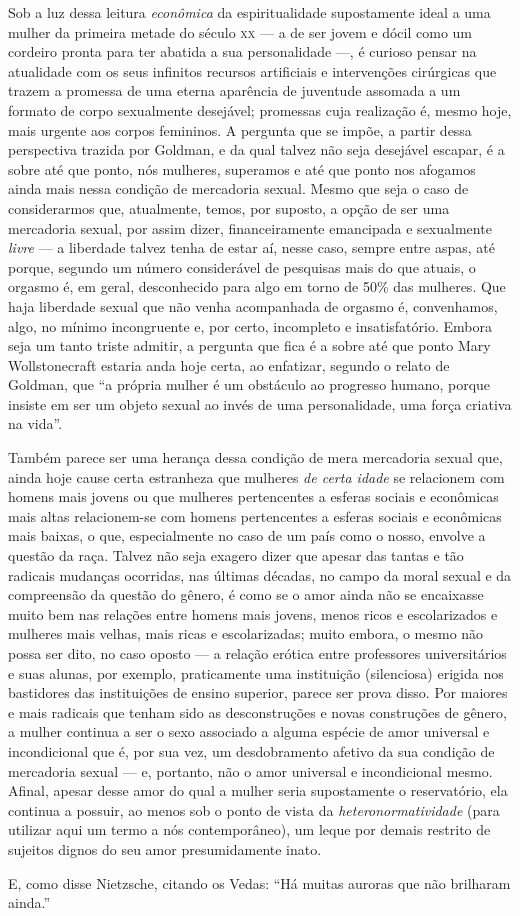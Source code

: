 Sob a luz dessa leitura \textit{econômica} da espiritualidade
supostamente ideal a uma mulher da primeira metade do século \textsc{xx} --- a de
ser jovem e dócil como um cordeiro pronta para ter abatida a sua
personalidade ---, é curioso pensar na atualidade com os seus infinitos
recursos artificiais e intervenções cirúrgicas que trazem a promessa de
uma eterna aparência de juventude assomada a um formato de corpo
sexualmente desejável; promessas cuja realização é, mesmo hoje, mais
urgente aos corpos femininos. A pergunta que se impõe, a partir dessa
perspectiva trazida por Goldman, e da qual talvez não seja desejável
escapar, é a sobre até que ponto, nós mulheres, superamos e até que
ponto nos afogamos ainda mais nessa condição de mercadoria sexual. Mesmo
que seja o caso de considerarmos que, atualmente, temos, por suposto, a
opção de ser uma mercadoria sexual, por assim dizer, financeiramente
emancipada e sexualmente \textit{livre} --- a liberdade talvez tenha de estar
aí, nesse caso, sempre entre aspas, até porque, segundo um número
considerável de pesquisas mais do que atuais, o orgasmo é, em geral,
desconhecido para algo em torno de 50\% das mulheres. Que haja liberdade
sexual que não venha acompanhada de orgasmo é, convenhamos, algo, no
mínimo incongruente e, por certo, incompleto e insatisfatório. Embora
seja um tanto triste admitir, a pergunta que fica é a sobre até que
ponto Mary Wollstonecraft estaria anda hoje certa, ao enfatizar, segundo
o relato de Goldman, que ``a própria mulher é um obstáculo ao progresso
humano, porque insiste em ser um objeto sexual ao invés de uma
personalidade, uma força criativa na vida''.

Também parece ser uma herança dessa condição de mera mercadoria sexual
que, ainda hoje cause certa estranheza que mulheres \textit{de certa idade}
se relacionem com homens mais jovens ou que mulheres pertencentes a
esferas sociais e econômicas mais altas relacionem-se com homens
pertencentes a esferas sociais e econômicas mais baixas, o que,
especialmente no caso de um país como o nosso, envolve a questão da
raça. Talvez não seja exagero dizer que apesar das tantas e tão radicais
mudanças ocorridas, nas últimas décadas, no campo da moral sexual e da
compreensão da questão do gênero, é como se o amor ainda não se
encaixasse muito bem nas relações entre homens mais jovens, menos ricos
e escolarizados e mulheres mais velhas, mais ricas e escolarizadas;
muito embora, o mesmo não possa ser dito, no caso oposto --- a relação
erótica entre professores universitários e suas alunas, por exemplo,
praticamente uma instituição (silenciosa) erigida nos bastidores das
instituições de ensino superior, parece ser prova disso. Por maiores e
mais radicais que tenham sido as desconstruções e novas construções de
gênero, a mulher continua a ser o sexo associado a alguma espécie de
amor universal e incondicional que é, por sua vez, um desdobramento
afetivo da sua condição de mercadoria sexual --- e, portanto, não o amor
universal e incondicional mesmo. Afinal, apesar desse amor do qual a
mulher seria supostamente o reservatório, ela continua a possuir, ao
menos sob o ponto de vista da \textit{heteronormatividade} (para utilizar aqui um
termo a nós contemporâneo), um leque por demais restrito de sujeitos
dignos do seu amor presumidamente inato.

E, como disse Nietzsche, citando os Vedas: ``Há muitas auroras que não
brilharam ainda.''

